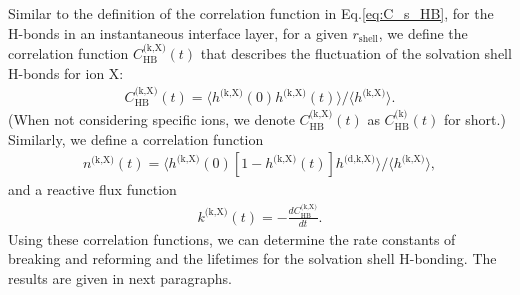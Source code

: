 Similar to the definition of the correlation function \CSHB in Eq.\thinspace\ref{eq:C_s_HB}, for the H-bonds in an instantaneous interface layer, 
for a given $r_\text{shell}$, we define the correlation function $C^\text{(k,X)}_\text{HB}(t)$ that describes the fluctuation of the solvation shell H-bonds for ion X: 
\begin{eqnarray}
C^\text{(k,X)}_{\text{HB}}(t)=\langle h^\text{(k,X)}(0)h^\text{(k,X)}(t) \rangle/\langle h^\text{(k,X)}\rangle
\label{eq:C_k_HB}.
\end{eqnarray}
(When not considering specific ions, we denote $C^\text{(k,X)}_{\text{HB}}(t)$ as $C^{\text{(k)}}_\text{HB}(t)$ for short.)
%
Similarly, we define a correlation function 
\begin{eqnarray}
n^\text{(k,X)}(t)=\langle h^\text{(k,X)}(0)[1-h^\text{(k,X)}(t)]h^\text{(d,k,X)} \rangle/\langle h^\text{(k,X)}\rangle
\label{eq:n_k_HB},
\end{eqnarray}
and a reactive flux function
\begin{eqnarray}
k^\text{(k,X)}(t)= -\frac{dC_\text{HB}^\text{(k,X)}}{dt}
\label{eq:k_k_HB}.
\end{eqnarray}
Using these correlation functions, we can determine the rate constants of breaking and reforming and the lifetimes for the solvation shell H-bonding.
The results are given in next paragraphs.
%
